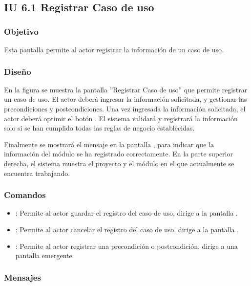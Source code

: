 \subsection{IU 6.1 Registrar Caso de uso}

\subsubsection{Objetivo}
	Esta pantalla permite al actor registrar la información de un caso de uso.
\subsubsection{Diseño}
	En la figura  se muestra la pantalla ''Registrar Caso de uso'' que permite registrar un caso de
	uso. El actor deberá ingresar la información solicitada, y gestionar las precondiciones y postcondiciones.
	Una vez ingresada la información solicitada, el actor deberá oprimir el botón  . El sistema validará y registrará la información solo si se han cumplido todas las reglas de negocio establecidas.
	
	Finalmente se mostrará el mensaje  en la pantalla , para indicar que la información del módulo se ha registrado correctamente.
	En la parte superior derecha, el sistema muestra el proyecto y el módulo en el que actualmente se encuentra trabajando.

\subsubsection{Comandos}
\begin{itemize}
	\item {}: Permite al actor guardar el registro del caso de uso, dirige a la pantalla .
	\item {}: Permite al actor cancelar el registro del caso de uso, dirige a la pantalla .
	\item {}: Permite al actor registrar una precondición o postcondición, dirige a una pantalla emergente.
\end{itemize}

\subsubsection{Mensajes}

